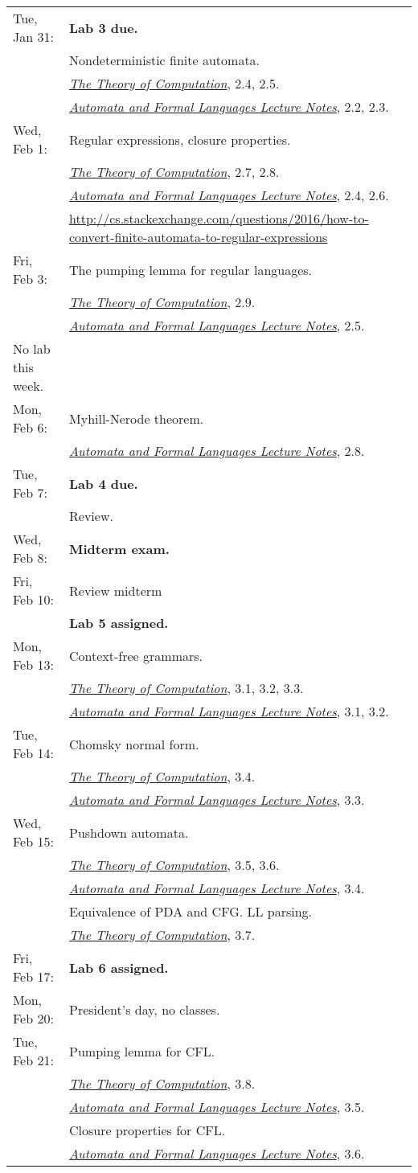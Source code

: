 \documentclass{article}
\newcommand{\theory}
           {\href{http://cg.scs.carleton.ca/~michiel/TheoryOfComputation/}
             {{\em The Theory of Computation}}}
\newcommand{\automata}
           {\href{http://users.utu.fi/jkari/automata/}
             {{\em Automata and Formal Languages Lecture Notes}}}
\begin{document}
\begin{longtable}{ll}
Tue, Jan 31:
& {\bf Lab 3 due.}
\\& Nondeterministic finite automata.
\\&\theory, 2.4, 2.5.
\\&\automata, 2.2, 2.3.
\\
Wed, Feb 1:
& Regular expressions, closure properties.
\\&\theory, 2.7,   2.8.
\\&\automata, 2.4, 2.6.
\\&\url{http://cs.stackexchange.com/questions/2016/how-to-convert-finite-automata-to-regular-expressions}
\\
Fri, Feb 3:
& The pumping lemma for regular languages.
\\&\theory, 2.9.
\\&\automata, 2.5.
\\\hline
No lab this week.
\\
Mon, Feb 6:
& Myhill-Nerode theorem.
\\&\automata, 2.8.
\\
Tue, Feb 7:
& {\bf Lab 4 due.}
\\& Review.
\\
Wed, Feb 8:
& {\bf Midterm exam.}
\\
Fri, Feb 10:
& Review midterm
\\& {\bf Lab 5 assigned.}
\\\hline
Mon, Feb 13:
& Context-free grammars.
\\&\theory, 3.1, 3.2, 3.3.
\\&\automata, 3.1,  3.2.
\\
Tue, Feb 14:
& Chomsky normal form.  \\&\theory, 3.4. \\&\automata, 3.3.
\\
Wed, Feb 15:
& Pushdown automata. \\&\theory, 3.5, 3.6.  \\&\automata, 3.4.
\\& Equivalence of PDA and CFG.  LL parsing. \\&\theory, 3.7.
\\
Fri, Feb 17:
& {\bf Lab 6 assigned.}
\\\hline
Mon, Feb 20:&  President's day, no classes.
\\
Tue, Feb 21:
& Pumping lemma for CFL.  \\&\theory, 3.8.  \\&\automata, 3.5.
\\& Closure properties for CFL. \\&\automata, 3.6.

\end{longtable}
\end{document}
